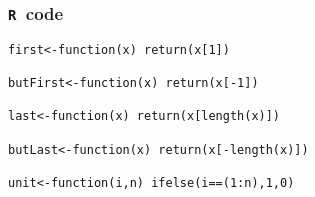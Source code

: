 \documentclass[11pt]{amsart}
\theoremstyle{plain}
\theoremstyle{definition}
\theoremstyle{remark}
\newcommand{\tR}{\texttt{R}}
\begin{document}
\subsubsection{\tR\ code}\quad
\begin{lstlisting}
first<-function(x) return(x[1])

butFirst<-function(x) return(x[-1])

last<-function(x) return(x[length(x)])

butLast<-function(x) return(x[-length(x)])

unit<-function(i,n) ifelse(i==(1:n),1,0)
\end{lstlisting}



\end{document}
